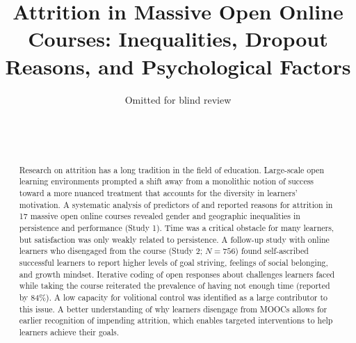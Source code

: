 \documentclass{sigchi}\usepackage[]{graphicx}\usepackage[]{color}
\begin{document}
\title{Attrition in Massive Open Online Courses: Inequalities, Dropout Reasons, and Psychological Factors}

\author{
  \alignauthor Omitted for blind review\\
  \\
  \\
  \\
}

\maketitle

\begin{abstract}
Research on attrition has a long tradition in the field of education. Large-scale open learning environments prompted a shift away from a monolithic notion of success toward a more nuanced treatment that accounts for the diversity in learners' motivation. A systematic analysis of predictors of and reported reasons for attrition in 17 massive open online courses revealed gender and geographic inequalities in persistence and performance (Study 1). Time was a critical obstacle for many learners, but satisfaction was only weakly related to persistence. A follow-up study with online learners who disengaged from the course (Study 2; $N = 756$) found self-ascribed successful learners to report higher levels of goal striving, feelings of social belonging, and growth mindset. Iterative coding of open responses about challenges learners faced while taking the course reiterated the prevalence of having not enough time (reported by 84\%). A low capacity for volitional control was identified as a large contributor to this issue. A better understanding of why learners disengage from MOOCs allows for earlier recognition of impending attrition, which enables targeted interventions to help learners achieve their goals.
\end{abstract}
\end{document}
